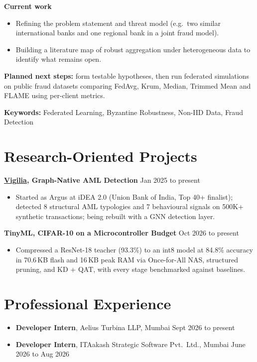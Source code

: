 \documentclass[10pt,a4paper]{article}
\newcommand{\proj}[2]{\textbf{#1} \hfill #2}
\begin{document}
\textbf{Current work}
\begin{itemize}
  \item Refining the problem statement and threat model (e.g.\ two similar international banks and one regional bank in a joint fraud model).
  \item Building a literature map of robust aggregation under heterogeneous data to identify what remains open.
\end{itemize}

\textbf{Planned next steps:} form testable hypotheses, then run federated simulations on public fraud datasets comparing FedAvg, Krum, Median, Trimmed Mean and FLAME using per-client metrics.

\textbf{Keywords:} Federated Learning, Byzantine Robustness, Non-IID Data, Fraud Detection

\section{Research-Oriented Projects}
\proj{\href{https://github.com/VirajSanghavi007/Vigilia}{\underline{Vigilia}}, Graph-Native AML Detection}{Jan 2025 to present}
\begin{itemize}
  \item Started as Argus at iDEA 2.0 (Union Bank of India, Top 40+ finalist); detected 8 structural AML typologies and 7 behavioural signals on 500K+ synthetic transactions; being rebuilt with a GNN detection layer.
\end{itemize}
\vspace{2pt}
\proj{TinyML, CIFAR-10 on a Microcontroller Budget}{Oct 2026 to present}
\begin{itemize}
  \item Compressed a ResNet-18 teacher (93.3\%) to an int8 model at 84.8\% accuracy in 70.6\,KB flash and 16\,KB peak RAM via Once-for-All NAS, structured pruning, and KD + QAT, with every stage benchmarked against baselines.
\end{itemize}

\section{Professional Experience}
\begin{itemize}
  \item \textbf{Developer Intern}, Aelius Turbina LLP, Mumbai \hfill Sept 2026 to present
  \item \textbf{Developer Intern}, ITAakash Strategic Software Pvt.\ Ltd., Mumbai \hfill June 2026 to Aug 2026
\end{itemize}
\end{document}

